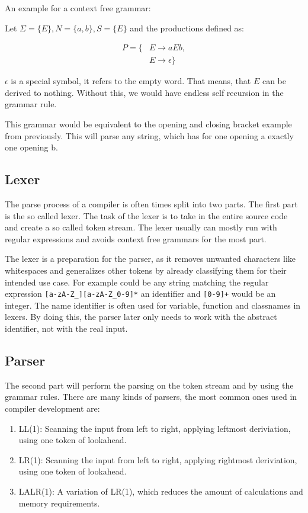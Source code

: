 An example for a context free grammar:

Let $\Sigma = \{E\}, N = \{a, b\}, S = \{E\}$ and the productions defined as:

\begin{align*}
P = \{&E \to a E b,\\
&E \to \epsilon\}
\end{align*}

$\epsilon$ is a special symbol, it refers to the empty word. That means, that $E$ can be derived to nothing. Without this, we would have endless self recursion in the grammar rule.

This grammar would be equivalent to the opening and closing bracket example from previously. This will parse any string, which has for one opening a exactly one opening b.


\subsection{Lexer}

The parse process of a compiler is often times split into two parts. The first part is the so called lexer. The task of the lexer is to take in the entire source code and create a so called token stream. The lexer usually can mostly run with regular expressions and avoids context free grammars for the most part.

The lexer is a preparation for the parser, as it removes unwanted characters like whitespaces and generalizes other tokens by already classifying them for their intended use case. For example could be any string matching the regular expression \verb|[a-zA-Z_][a-zA-Z_0-9]*| an identifier and \verb|[0-9]+| would be an integer. The name identifier is often used for variable, function and classnames in lexers. By doing this, the parser later only needs to work with the abstract identifier, not with the real input.

\subsection{Parser}

The second part will perform the parsing on the token stream and by using the grammar rules. There are many kinds of parsers, the most common ones used in compiler development are:

\begin{enumerate}
\item LL(1): Scanning the input from left to right, applying leftmost deriviation, using one token of lookahead.
\item LR(1): Scanning the input from left to right, applying rightmost deriviation, using one token of lookahead.
\item LALR(1): A variation of LR(1), which reduces the amount of calculations and memory requirements.
\end{enumerate}

